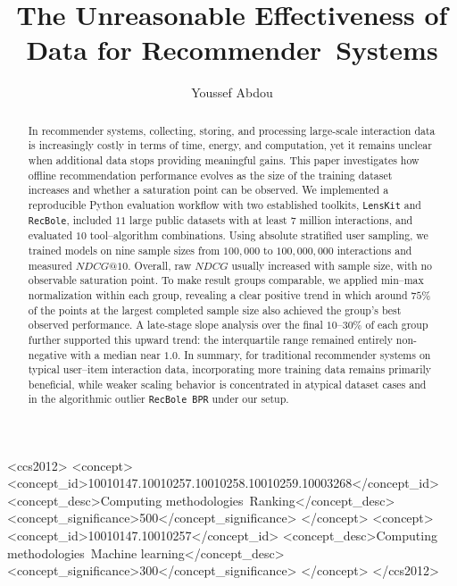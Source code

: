 \documentclass[sigconf,nonacm]{acmart}
\begin{document}
\title{The Unreasonable Effectiveness of Data for Recommender~Systems}

\author{Youssef Abdou}

\begin{abstract}
  In recommender systems, collecting, storing, and processing large-scale interaction data is increasingly costly in terms of time, energy, and computation, yet it remains unclear when additional data stops providing meaningful gains. This paper investigates how offline recommendation performance evolves as the size of the training dataset increases and whether a saturation point can be observed. We implemented a reproducible Python evaluation workflow with two established toolkits, \texttt{LensKit} and \texttt{RecBole}, included $11$ large public datasets with at least $7$ million interactions, and evaluated $10$ tool--algorithm combinations. Using absolute stratified user sampling, we trained models on nine sample sizes from $100{,}000$ to $100{,}000{,}000$ interactions and measured $NDCG@10$. Overall, raw $NDCG$ usually increased with sample size, with no observable saturation point. To make result groups comparable, we applied min--max normalization within each group, revealing a clear positive trend in which around $75\%$ of the points at the largest completed sample size also achieved the group's best observed performance. A late-stage slope analysis over the final $10$--$30\%$ of each group further supported this upward trend: the interquartile range remained entirely non-negative with a median near $1.0$. In summary, for traditional recommender systems on typical user--item interaction data, incorporating more training data remains primarily beneficial, while weaker scaling behavior is concentrated in atypical dataset cases and in the algorithmic outlier \texttt{RecBole BPR} under our setup.
\end{abstract}

\begin{CCSXML}
<ccs2012>
   <concept>
       <concept_id>10010147.10010257.10010258.10010259.10003268</concept_id>
       <concept_desc>Computing methodologies~Ranking</concept_desc>
       <concept_significance>500</concept_significance>
       </concept>
   <concept>
       <concept_id>10010147.10010257</concept_id>
       <concept_desc>Computing methodologies~Machine learning</concept_desc>
       <concept_significance>300</concept_significance>
       </concept>
 </ccs2012>
\end{CCSXML}
\end{document}
